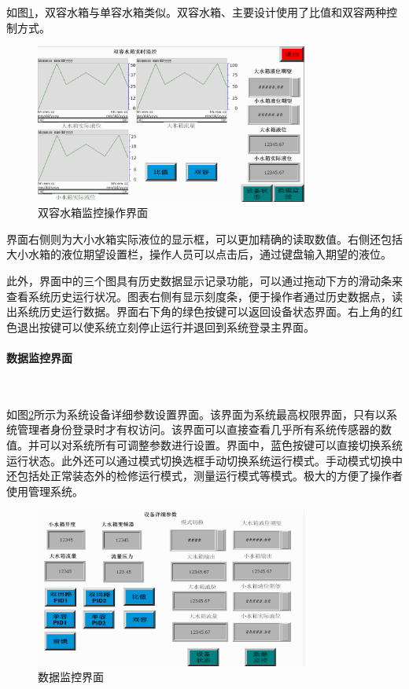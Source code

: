 \documentclass[UTF8]{article}
\begin{document}
如图\ref{fig:img9}，双容水箱与单容水箱类似。双容水箱、主要设计使用了比值和双容两种控制方式。
\begin{figure}[H]
    \centering %
    \includegraphics[width=0.8\textwidth]{figure/双容水箱监控操作界面.png} 
    \caption{双容水箱监控操作界面} %
    \label{fig:img9} %
\end{figure}

界面右侧则为大小水箱实际液位的显示框，可以更加精确的读取数值。右侧还包括大小水箱的液位期望设置栏，操作人员可以点击后，通过键盘输入期望的液位。

此外，界面中的三个图具有历史数据显示记录功能，可以通过拖动下方的滑动条来查看系统历史运行状况。图表右侧有显示刻度条，便于操作者通过历史数据点，读出系统历史运行数据。界面右下角的绿色按键可以返回设备状态界面。右上角的红色退出按键可以使系统立刻停止运行并退回到系统登录主界面。

\paragraph{数据监控界面}~{}

如图\ref{fig:img10}所示为系统设备详细参数设置界面。该界面为系统最高权限界面，只有以系统管理者身份登录时才有权访问。该界面可以直接查看几乎所有系统传感器的数值。并可以对系统所有可调整参数进行设置。界面中，蓝色按键可以直接切换系统运行状态。此外还可以通过模式切换选框手动切换系统运行模式。手动模式切换中还包括处正常装态外的检修运行模式，测量运行模式等模式。极大的方便了操作者使用管理系统。
\begin{figure}[H]
    \centering %
    \includegraphics[width=0.8\textwidth]{figure/数据监控界面.png} 
    \caption{数据监控界面} %
    \label{fig:img10} %
\end{figure}
\end{document}
